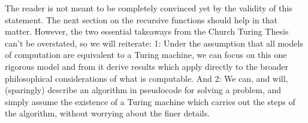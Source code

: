 The reader is not meant to be completely convinced yet by the validity of this statement. The next section on the recursive functions should help in that matter. However, the two essential takeaways from the Church Turing Thesis can't be overstated, so we will reiterate: 1: Under the assumption that all models of computation are equivalent to a Turing machine, we can focus on this one rigorous model and from it derive results which apply directly to the broader philosophical considerations of what is computable. And 2: We can, and will, (sparingly) describe an algorithm in pseudocode for solving a problem, and simply assume the existence of a Turing machine which carries out the steps of the algorithm, without worrying about the finer details.

